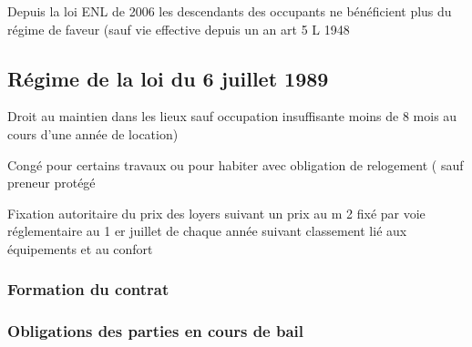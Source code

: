\documentclass[10pt,a4paper,twoside]{article}
\begin{document}
			Depuis la loi ENL de 2006 les descendants des occupants ne
			bénéficient plus du régime de faveur (sauf vie effective depuis
			un an art 5 L 1948

	\subsection{Régime de la loi du 6 juillet 1989}

		Droit au maintien dans les lieux sauf occupation insuffisante
		moins de 8 mois au cours d’une année de location)

		Congé pour certains travaux ou pour habiter avec obligation
		de relogement ( sauf preneur protégé

		Fixation autoritaire du prix des loyers suivant un prix au m 2
		fixé par voie réglementaire au 1 er juillet de chaque année
		suivant classement lié aux équipements et au confort

		\subsubsection{Formation du contrat}

		\subsubsection{Obligations des parties en cours de bail}

\pagebreak

\tableofcontents
\end{document}
